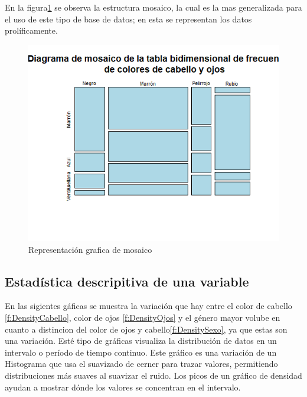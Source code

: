 \documentclass[12pt,a4paper]{article}
\begin{document}
En la figura\ref{fig:Mosaico} se observa la estructura mosaico, la cual es la mas generalizada para el uso de este tipo de base de datos; en esta se representan los datos prolíficamente\citep{CodigoRPubs}.

\begin{figure}[h]
\centering
\includegraphics[scale=0.7]{Mosaico}
\caption{Representación grafica de mosaico}
\label{fig:Mosaico}
\end{figure}

\newpage


\subsection{Estadística descripitiva de una variable}

En las sigientes gáficas se muestra la variación que hay entre el color de cabello \ref{f:DensityCabello}, color de ojos   \ref{f:DensityOjos} y el género mayor volube en cuanto a distincion del color de ojos y cabello\ref{f:DensitySexo}, ya que estas son una variación. 
\newline
\newline
Esté tipo de gráficas visualiza la distribución de datos en un intervalo o período de tiempo continuo. Este gráfico es una variación de un Histograma que usa el suavizado de cerner para trazar valores, permitiendo distribuciones más suaves al suavizar el ruido. Los picos de un gráfico de densidad ayudan a mostrar dónde los valores se concentran en el intervalo.
\end{document}
